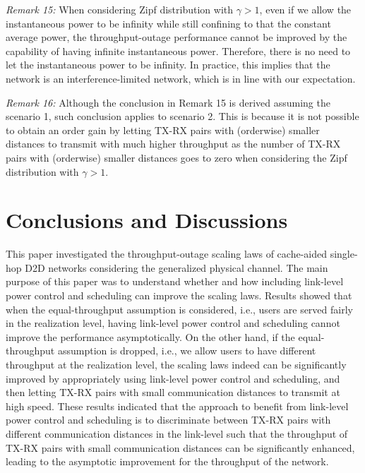 \documentclass[journal,draftclsnofoot,onecolumn,12pt,twoside]{IEEEtran}
\begin{document}
{\em Remark 15:} When considering Zipf distribution with $\gamma>1$, even if we allow the instantaneous power to be infinity while still confining to that the constant average power, the throughput-outage performance cannot be improved by the capability of having infinite instantaneous power. Therefore, there is no need to let the instantaneous power to be infinity. In practice, this implies that the network is an interference-limited network, which is in line with our expectation.

{\em Remark 16:} Although the conclusion in Remark 15 is derived assuming the scenario 1, such conclusion applies to scenario 2. This is because it is not possible to obtain an order gain by letting TX-RX pairs with (orderwise) smaller distances to transmit with much higher throughput as the number of TX-RX pairs with (orderwise) smaller distances goes to zero when considering the Zipf distribution with $\gamma>1$. %

\section{Conclusions and Discussions}

This paper investigated the throughput-outage scaling laws of cache-aided single-hop D2D networks considering the generalized physical channel. The main purpose of this paper was to understand whether and how including link-level power control and scheduling can improve the scaling laws. Results showed that when the equal-throughput assumption is considered, i.e., users are served fairly in the realization level, having link-level power control and scheduling cannot improve the performance asymptotically. On the other hand, if the equal-throughput assumption is dropped, i.e., we allow users to have different throughput at the realization level, the scaling laws indeed can be significantly improved by appropriately using link-level power control and scheduling, and then letting TX-RX pairs with small communication distances to transmit at high speed. These results indicated that the approach to benefit from link-level power control and scheduling is to discriminate between TX-RX pairs with different communication distances in the link-level such that the throughput of TX-RX pairs with small communication distances can be significantly enhanced, leading to the asymptotic improvement for the throughput of the network.
\end{document}
